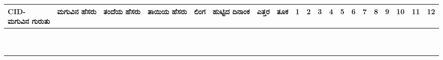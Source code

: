 ﻿\documentclass[12pt]{article}
\newcommand{\kn}[1]{%
{\fontspec[Script=Kannada]{Kedage}%
#1
}}
\begin{document}
\begin{tabular}{|l|p{3cm}|p{3cm}|p{3cm}|p{1.5cm}|p{1.5cm}|l|l|l|l|l|l|l|l|l|l|l|l|l|l|}
\makecell[b]{CID-\\ \kn{ಮಗುವಿನ ಗುರುತು}} & \kn{ಮಗುವಿನ ಹೆಸರು} & \kn{ತಂದೆಯ ಹೆಸರು} & \kn{ತಾಯಿಯ ಹೆಸರು} & \kn{ಲಿಂಗ} & \kn{ಹುಟ್ಟಿದ ದಿನಾಂಕ} & \kn{ಎತ್ತರ} & \kn{ತೂಕ}  & 1 & 2 & 3 & 4 & 5 & 6 & 7 & 8 & 9 & 10 & 11 &12 \\ \hline
 &  &  &  &  &  & & & & & & & & & & & & & &  \\ \hline
 &  &  &  &  &  & & & & & & & & & & & & & &  \\ \hline
 &  &  &  &  &  & & & & & & & & & & & & & &  \\ \hline
 &  &  &  &  &  & & & & & & & & & & & & & &  \\ \hline
 &  &  &  &  &  & & & & & & & & & & & & & &  \\ \hline
 &  &  &  &  &  & & & & & & & & & & & & & &  \\ \hline
 &  &  &  &  &  & & & & & & & & & & & & & &  \\ \hline
 &  &  &  &  &  & & & & & & & & & & & & & &  \\ \hline
 &  &  &  &  &  & & & & & & & & & & & & & &  \\ \hline
 &  &  &  &  &  & & & & & & & & & & & & & &  \\ \hline

\end{tabular}

\pagebreak

\end{document}
